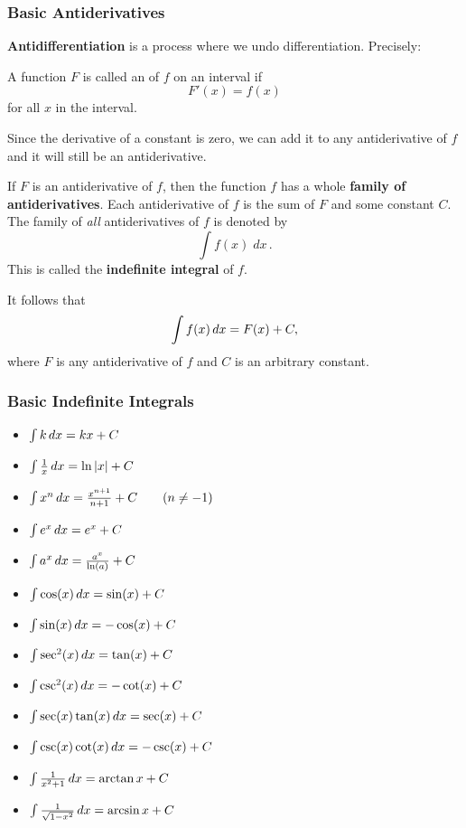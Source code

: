 \documentclass[10pt,t,handout,ignorenonframetext,aspectratio=169]{beamer}
\title[\course]{\lecTitle}
\institute[Ohio State]
{
  \medskip
}
\date[\week]{\semester}
\author{Tae Eun Kim, Ph.D.}
\begin{document}
\begin{frame}
  \titlepage
\end{frame}


\begin{frame}
  \frametitle{Basic Antiderivatives}

  \textbf{Antidifferentiation} is a process where we undo differentiation. Precisely:
  \begin{defn}
    A function $F$ is called an  of $f$ on an
    interval if
    \[
      F'(x) = f(x)
    \]
    for all $x$ in the interval.
  \end{defn}

\end{frame}

\begin{frame}
  \vs
  Since the derivative of a constant is zero, we can add it to any
  antiderivative of $f$ and it will still be an antiderivative.


  \begin{thm}
    If $F$ is an antiderivative of $f$, then the function $f$ has a
    whole \textbf{family of antiderivatives}. Each antiderivative of $f$
    is the sum of $F$ and some constant $C$. The family of \textit{all}
    antiderivatives of $f$ is denoted by
    \[
      \int f(x) \; dx \,.
    \]
    This is called the \textbf{indefinite integral} of $f$.
  \end{thm}

  It follows that
  \[
    \int f(x) \mathop{}\!d x =F(x)+C,
  \]
  where $F$ is any antiderivative of $f$ and $C$ is an arbitrary constant.

\end{frame}

\begin{frame}
  \frametitle{Basic Indefinite Integrals}
  \begin{itemize}
  \item $\int k \mathop{}\!d x= k x+C$
  \item $\int \frac{1}{x} \mathop{}\!d x= \ln|x|+C$
  \item $\int x^n \mathop{}\!d x= \frac{x^{n+1}}{n+1}+C\qquad(n\ne-1)$
  \item $\int e^x \mathop{}\!d x= e^x + C$
  \item $\int a^x \mathop{}\!d x= \frac{a^x}{\ln(a)}+C$
  \item $\int \cos(x) \mathop{}\!d x = \sin(x) + C$
  \item $\int \sin(x) \mathop{}\!d x = -\cos(x) + C$
  \item $\int \sec^2(x) \mathop{}\!d x = \tan(x) + C$
  \item $\int \csc^2(x) \mathop{}\!d x = -\cot(x) + C$
  \item $\int \sec(x)\tan(x) \mathop{}\!d x = \sec(x) + C$
  \item $\int \csc(x)\cot(x) \mathop{}\!d x = -\csc(x) + C$
  \item $\int \frac{1}{x^2+1}\mathop{}\!d x = \arctan{x} + C$
  \item $\int \frac{1}{\sqrt{1-x^2}}\mathop{}\!d x= \arcsin{x}+C$
  \end{itemize}
\end{frame}
\end{document}
